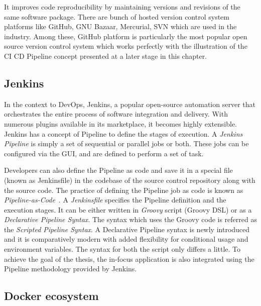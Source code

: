 It improves code reproducibility by maintaining versions and revisions of the same software package. There are bunch of hosted version control system platforms like GitHub, GNU Bazaar, Mercurial, SVN which are used in the industry. Among these, GitHub platform is particularly the most popular open source version control system which works perfectly with the illustration of the \ac{CI} \ac{CD} Pipeline concept presented at a later stage in this chapter.


\subsection{Jenkins} \label{section:Jenkins}
 
In the context to DevOps, Jenkins, a popular open-source automation server that orchestrates the entire process of software integration and delivery. With numerous plugins available in its marketplace, it becomes highly extensible. Jenkins has a concept of Pipeline to define the stages of execution. A \emph{Jenkins Pipeline} is simply a set of sequential or parallel jobs or both. These jobs can be configured via the GUI, and are defined to perform a set of task. 

Developers can also define the Pipeline as code and save it in a special file (known as Jenkinsfile) in the codebase of the source control repository along with the source code. The practice of defining the Pipeline job as code is known as \emph{Pipeline-as-Code}~\parencite{pathania2017pro}. A \emph{Jenkinsfile} specifies the Pipeline definition and the execution stages. It can be either written in \emph{Groovy} script (Groovy \ac{DSL}) or as a \emph{Declarative Pipeline Syntax}. The syntax which uses the Groovy code is referred as the \emph{Scripted Pipeline Syntax}. A Declarative Pipeline syntax is newly introduced and it is comparatively modern with added flexibility for conditional usage and environment variables. The syntax for both the script only differs a little.
To achieve the goal of the thesis, the in-focus application is also integrated using the Pipeline methodology provided by Jenkins.

\subsection{Docker ecosystem}

